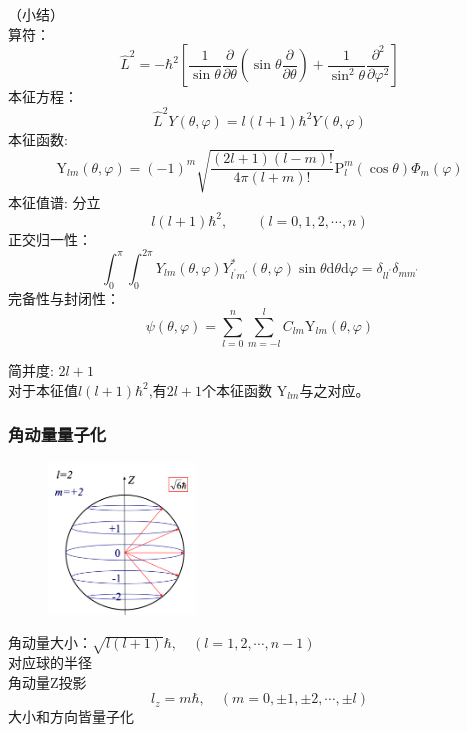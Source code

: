 \begin{frame} [allowframebreaks=]
    （小结）\\ \vspace{0.3em}
    算符：  $$ \hat{L}^{2}=-\hbar^{2}\left[\frac{1}{\sin \theta} \frac{\partial}{\partial \theta}\left(\sin \theta \frac{\partial}{\partial \theta}\right)+\frac{1}{\sin ^{2} \theta} \frac{\partial^{2}}{\partial \varphi^{2}}\right] $$
    本征方程： $$\hat{L}^2Y(\theta,\varphi)=l(l+1)\hbar^2 Y(\theta,\varphi)$$
    本征函数:     $$
    \mathrm{Y}_{l m}(\theta, \varphi)=(-1)^{m} \sqrt{\frac{(2 l+1)(l-m) !}{4 \pi(l+m) !}} \mathrm{P}_{l}^{m}(\cos \theta) \Phi_{m}(\varphi)
    $$ 
    本征值谱:  分立
    $$l(l+1)\hbar^2, \qquad (l= 0,1,2,\cdots, n) $$
    正交归一性：
    $$
    \int_{0}^{\pi} \int_{0}^{2 \pi} Y_{l m}(\theta, \varphi) Y_{l^{\prime} m^{\prime}}^{*}(\theta, \varphi) \sin \theta \mathrm{d} \theta \mathrm{d} \varphi=\delta_{l l^{\prime}} \delta_{m m^{\prime}}
    $$
    完备性与封闭性：
    $$\psi(\theta, \varphi)=\sum_{l=0}^{n} \sum_{m=-l}^{l} C_{l m} \mathrm{Y}_{l m}(\theta, \varphi)$$

    简并度: $2l+1$\\
    对于本征值$l(l+1)\hbar^2$,有$2l+1$个本征函数 $\mathrm{Y}_{l m}$与之对应。
\end{frame} 

\begin{frame} 
    \frametitle{角动量量子化}
    \begin{figure} %
        \includegraphics[width=0.35\textwidth]{figs/LandL2.png}   
    \end{figure}
    {\Bullet} 角动量大小：$\sqrt{l(l+1)}\hbar, \quad (l=1,2,\cdots, n-1)$\\
    对应球的半径\\ \vspace{0.3em}
    {\Bullet} 角动量Z投影 
    $$l_z=m\hbar, \quad (m=0,\pm 1,\pm 2, \cdots, \pm l)$$
    {\Bullet} 大小和方向皆量子化
\end{frame} 

